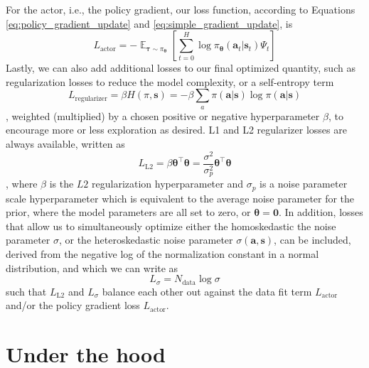 \documentclass{article}
\begin{document}
For the actor, i.e., the policy gradient, our loss function, according to Equations \ref{eq:policy_gradient_update} and \ref{eq:simple_gradient_update}, is \begin{equation}L_\text{actor}=-\mathop{\mathbb{E}}_{\boldsymbol{\tau}\sim\pi_{\boldsymbol{\theta}}}\left[\sum_{t=0}^H\log\pi_{\boldsymbol{\theta}}(\mathbf{a}_t|\mathbf{s}_t)\Psi_t\right]\end{equation}Lastly, we can also add additional losses to our final optimized quantity, such as regularization losses to reduce the model complexity, or a self-entropy term \begin{equation}L_\text{regularizer}=\beta H(\pi, \mathbf{s})=-\beta \sum_a\pi(\mathbf{a}|\mathbf{s})\log\pi(\mathbf{a}|\mathbf{s})\end{equation}, weighted (multiplied) by a chosen positive or negative hyperparameter $\beta$, to encourage more or less exploration as desired.  L1 and L2 regularizer losses are always available, written as \begin{equation}L_\text{L2}=\beta\boldsymbol{\theta}^\top\boldsymbol{\theta}=\frac{\sigma^2}{\sigma_p^2}\boldsymbol{\theta}^\top\boldsymbol{\theta}\end{equation}, where $\beta$ is the $L2$ regularization hyperparameter and $\sigma_p$ is a noise parameter scale hyperparameter which is equivalent to the average noise parameter for the prior, where the model parameters are all set to zero, or $\boldsymbol{\theta}=\mathbf{0}$. In addition, losses that allow us to simultaneously optimize either the homoskedastic the noise parameter $\sigma$, or the heteroskedastic noise parameter $\sigma(\mathbf{a},\mathbf{s})$, can be included, derived from the negative log of the normalization constant in a normal distribution, and which we can write as \begin{equation}L_\sigma=N_\text{data}\log\sigma\end{equation}such that $L_\text{L2}$ and $L_\sigma$ balance each other out against the data fit term $L_\text{actor}$ and/or the policy gradient loss $L_\text{actor}$.

\section{Under the hood}
\end{document}
